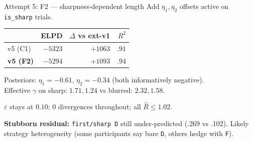 \documentclass[10pt,aspectratio=169]{beamer}
\newcommand{\hl}[1]{{\color{hlblue}\textbf{#1}}}
\begin{document}
\begin{frame}{Attempt 5: F2 --- sharpness-dependent length}
Add $\eta_1, \eta_2$ offsets active on \texttt{is\_sharp} trials.

\vspace{0.5em}
\begin{center}
\begin{tabular}{lrrr}
\toprule
& ELPD & $\Delta$ vs ext-v1 & $R^2$\\
\midrule
v5 (C1) & $-5323$ & $+1063$ & $.91$ \\
\hl{v5 (F2)} & \hl{$-5294$} & \hl{$+1093$} & \hl{$.94$} \\
\bottomrule
\end{tabular}
\end{center}

\vspace{0.5em}
Posteriors: $\eta_1 = -0.61$, $\eta_2 = -0.34$ (both informatively negative).\\
Effective $\gamma$ on sharp: $1.71, 1.24$ vs blurred: $2.32, 1.58$.

\vspace{0.5em}
$\varepsilon$ stays at $0.10$; 0 divergences throughout; all $\hat R \leq 1.02$.

\vspace{0.5em}
\hl{Stubborn residual:} \texttt{first/sharp D} still under-predicted (.269 vs .102). Likely strategy heterogeneity (some participants say bare \texttt{D}, others hedge with \texttt{F}).
\end{frame}
\end{document}
